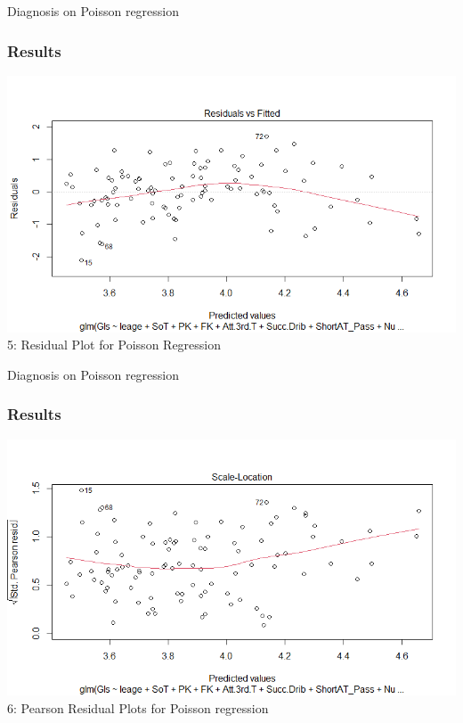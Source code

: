 \documentclass[11pt]{beamer}
\begin{document}
\begin{frame}{Diagnosis on Poisson regression}
	\frametitle{Results}
	\includegraphics[scale=0.5]{gls4}
	\figurename 5: Residual Plot for Poisson Regression
\end{frame}
\begin{frame}{Diagnosis on Poisson regression}
	\frametitle{Results}
	\includegraphics[scale=0.5]{gls5}
	\figurename 6: Pearson Residual Plots for Poisson regression
\end{frame}
\end{document}
